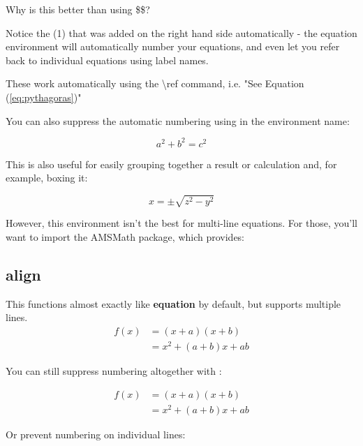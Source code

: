 \documentclass{article}
\begin{document}
        Why is this better than using \$\$?
        
        Notice the (1) that was added on the right hand side automatically - the equation environment will automatically number your equations, and even let you refer back to individual equations using label names. 
        
        These work automatically using the \textbackslash ref command, i.e. "See Equation (\ref{eq:pythagoras})"

        \newpage

        You can also suppress the automatic numbering using \* in the environment name:
        
        \begin{equation*}
            a^2 + b^2 = c^2
            \label{eq:pythagoras2}
        \end{equation*}
        
        This is also useful for easily grouping together a result or calculation and, for example, boxing it:
        
        \begin{equation}
         \boxed{x = \pm \sqrt{z^2 - y^2}}
        \end{equation}
        
        However, this environment isn't the best for multi-line equations. For those, you'll want to import the AMSMath package, which provides:

    \subsection{align}
        This functions almost exactly like \textbf{equation} by default, but supports multiple lines.
        \begin{align}
         f(x) &= (x+a)(x+b) \\
              &= x^2 + (a+b)x + ab
        \end{align}
        
        You can still suppress numbering altogether with \*:
        
        \begin{align*}
         f(x) &= (x+a)(x+b) \\
              &= x^2 + (a+b)x + ab
        \end{align*}
        
        Or prevent numbering on individual lines:
        
\end{document}
